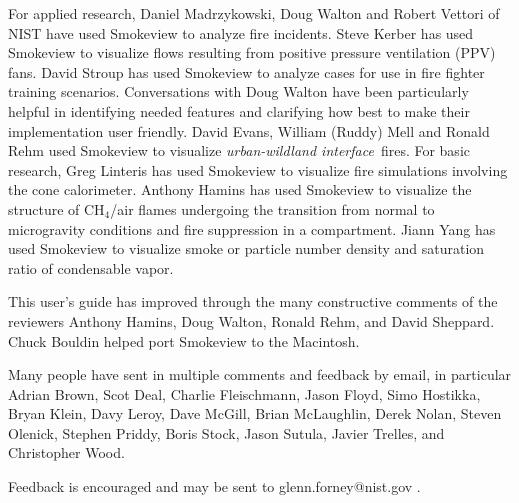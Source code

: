 \documentclass[11pt,twoside]{book}
\begin{document}
For applied research, Daniel Madrzykowski, Doug Walton and Robert
Vettori of NIST have used Smokeview to analyze fire incidents.
Steve Kerber has used Smokeview to visualize flows resulting from
positive pressure ventilation (PPV) fans. David Stroup has used Smokeview to analyze cases for use
in fire fighter training scenarios.  Conversations with Doug
Walton have been particularly helpful in identifying needed
features and clarifying how best to make their implementation user
friendly.  David Evans, William (Ruddy) Mell and Ronald Rehm used
Smokeview to visualize {\em urban-wildland interface}\ fires.   For
basic research, Greg Linteris has used Smokeview to visualize fire
simulations involving the cone calorimeter. Anthony Hamins has
used Smokeview to visualize the structure of CH$_4$/air flames
undergoing the transition from normal to microgravity conditions
and fire suppression in a compartment. Jiann Yang has used
Smokeview to visualize smoke or particle number density and
saturation ratio of condensable vapor.

This user's guide has improved through the many constructive
comments of the reviewers Anthony Hamins, Doug Walton, Ronald
Rehm, and David Sheppard. Chuck Bouldin helped port Smokeview to
the Macintosh.

Many people have sent in multiple comments and feedback by email,
in particular Adrian Brown, Scot Deal, Charlie Fleischmann, Jason
Floyd, Simo Hostikka, Bryan Klein, Davy Leroy, Dave McGill, Brian
McLaughlin, Derek Nolan, Steven Olenick, Stephen Priddy, Boris
Stock, Jason Sutula, Javier Trelles, and Christopher Wood.

Feedback is encouraged and may be sent to glenn.forney@nist.gov .

\tableofcontents
\listoffigures
\listoftables

\mainmatter


%
%
%
\end{document}
